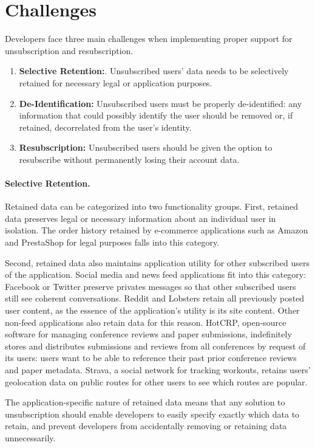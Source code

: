 \section{Challenges}
Developers face three main challenges when implementing proper support for unsubscription and
resubscription.
\begin{enumerate}
    \item \textbf{Selective Retention:}. Unsubscribed users' data needs to be selectively retained for necessary legal or application purposes.
    \item \textbf{De-Identification:} Unsubscribed users must be properly de-identified: any
        information that could possibly identify the user should be removed or, if retained, decorrelated from the user's identity.
\item \textbf{Resubscription:} Unsubscribed users should be given the option to resubscribe without permanently losing their account
data.
\end{enumerate}

\paragraph{Selective Retention.}
Retained data can be categorized into two functionality groups. First, retained data preserves legal or
necessary information about an individual user in isolation. The order history retained by
e-commerce applications such as Amazon and PrestaShop for legal purposes falls into this category.

Second, retained data also maintains application utility for other subscribed users of the
application. Social media and news feed applications fit into this category: Facebook or Twitter
preserve privates messages so that other subscribed users still see coherent conversations. Reddit
and Lobsters retain all previously posted user content, as the essence of the application's utility
is its site content.  Other non-feed applications also retain data for this reason. HotCRP,
open-source software for managing conference reviews and paper submissions, indefinitely stores and
distributes submissions and reviews from all conferences by request of its users: users want to be
able to reference their past prior conference reviews and paper metadata. Strava, a social network
for tracking workouts, retains users' geolocation data on public routes for other users to see which
routes are popular.

The application-specific nature of retained data means that any solution to unsubscription
should enable developers to easily specify exactly which data to retain, and prevent developers
from accidentally removing or retaining data unnecessarily.

